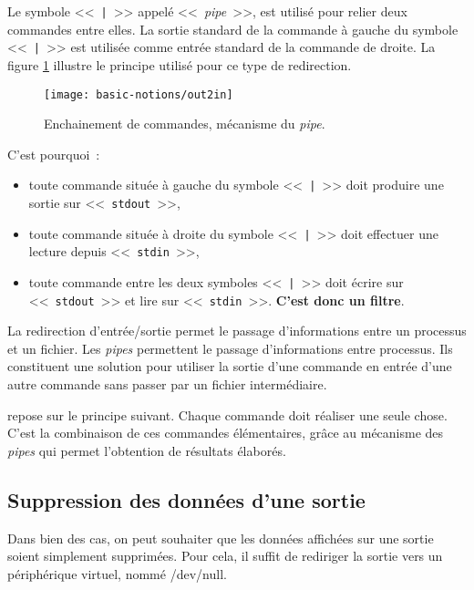 Le symbole <<~\texttt{|}~>> appel{\'e} <<~\textsl{pipe}~>>, est
utilis{\'e} pour relier deux commandes entre elles. La
sortie standard de la
commande {\`a} gauche du symbole <<~\texttt{|}~>> est utilis{\'e}e comme
entr{\'e}e standard de
la commande de droite. La figure \ref{fig-basnot-out2in} illustre le
principe utilis{\'e} pour ce type de redirection.

\begin{figure}[hbtp]
	\centering
	\texttt{[image: basic-notions/out2in]}
	\caption{\label{fig-basnot-out2in}Enchainement de commandes, m{\'e}canisme du \textsl{pipe}.}
\end{figure}

C'est pourquoi~:
\begin{itemize}
	\item	toute commande situ{\'e}e {\`a} gauche du symbole <<~\texttt{|}~>> doit produire une
			sortie sur <<~\texttt{stdout}~>>,
	\item	toute commande situ{\'e}e {\`a} droite du symbole <<~\texttt{|}~>> doit effectuer une
			lecture depuis <<~\texttt{stdin}~>>,
	\item	toute commande entre les deux symboles <<~\texttt{|}~>> doit {\'e}crire sur
			<<~\texttt{stdout}~>> et lire sur <<~\texttt{stdin}~>>. {\bf C'est donc un filtre}.
\end{itemize}

La redirection d'entr{\'e}e/sortie permet le passage d'informations entre un
processus et un fichier. Les \textsl{pipes} permettent le passage d'informations
entre processus. Ils constituent une solution pour utiliser la
sortie d'une commande en entr{\'e}e d'une autre commande sans passer par un
fichier interm{\'e}diaire.

{\Unix} repose sur le principe suivant. Chaque commande doit r{\'e}aliser
une seule chose. C'est la combinaison de ces commandes {\'e}l{\'e}mentaires,
gr{\^a}ce au m{\'e}canisme des \textsl{pipes} qui permet l'obtention de r{\'e}sultats
{\'e}labor{\'e}s.

\subsection{Suppression des donn{\'e}es d'une sortie}

Dans bien des cas, on peut souhaiter que les donn{\'e}es affich{\'e}es sur une sortie soient 
simplement supprim{\'e}es. Pour cela, il suffit de rediriger la sortie vers un p{\'e}riph{\'e}rique
virtuel, nomm{\'e} /dev/null. 
\begin{center}
\end{center}



